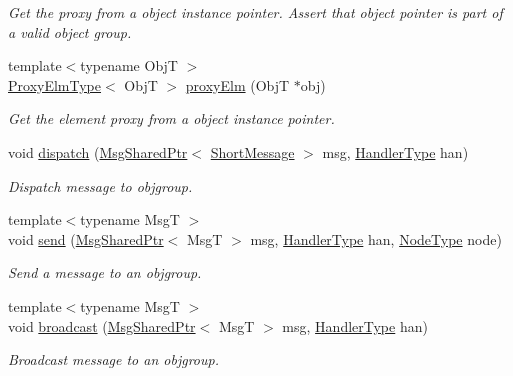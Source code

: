 \begin{DoxyCompactItemize}
\begin{DoxyCompactList}\small\item\em Get the proxy from a object instance pointer. Assert that object pointer is part of a valid object group. \end{DoxyCompactList}\item 
{\footnotesize template$<$typename ObjT $>$ }\\\hyperlink{structvt_1_1objgroup_1_1_obj_group_manager_adba6c8ecb0f4c30e719f1abb995cfc9b}{Proxy\+Elm\+Type}$<$ ObjT $>$ \hyperlink{structvt_1_1objgroup_1_1_obj_group_manager_a31f00bd509986001e3154af24239f24d}{proxy\+Elm} (ObjT $\ast$obj)
\begin{DoxyCompactList}\small\item\em Get the element proxy from a object instance pointer. \end{DoxyCompactList}\item 
void \hyperlink{structvt_1_1objgroup_1_1_obj_group_manager_ad3e01d20b90d5447445538541025aa4b}{dispatch} (\hyperlink{namespacevt_ab2b3d506ec8e8d1540aede826d84a239}{Msg\+Shared\+Ptr}$<$ \hyperlink{namespacevt_a1125ac1da6c0bbf141e0ea0739d7602d}{Short\+Message} $>$ msg, \hyperlink{namespacevt_af64846b57dfcaf104da3ef6967917573}{Handler\+Type} han)
\begin{DoxyCompactList}\small\item\em Dispatch message to objgroup. \end{DoxyCompactList}\item 
{\footnotesize template$<$typename MsgT $>$ }\\void \hyperlink{structvt_1_1objgroup_1_1_obj_group_manager_a58abda8b7d1372bea7ca061402e69c75}{send} (\hyperlink{namespacevt_ab2b3d506ec8e8d1540aede826d84a239}{Msg\+Shared\+Ptr}$<$ MsgT $>$ msg, \hyperlink{namespacevt_af64846b57dfcaf104da3ef6967917573}{Handler\+Type} han, \hyperlink{namespacevt_a866da9d0efc19c0a1ce79e9e492f47e2}{Node\+Type} node)
\begin{DoxyCompactList}\small\item\em Send a message to an objgroup. \end{DoxyCompactList}\item 
{\footnotesize template$<$typename MsgT $>$ }\\void \hyperlink{structvt_1_1objgroup_1_1_obj_group_manager_a4bd17271d7a5d298ac74c73eedde4d8d}{broadcast} (\hyperlink{namespacevt_ab2b3d506ec8e8d1540aede826d84a239}{Msg\+Shared\+Ptr}$<$ MsgT $>$ msg, \hyperlink{namespacevt_af64846b57dfcaf104da3ef6967917573}{Handler\+Type} han)
\begin{DoxyCompactList}\small\item\em Broadcast message to an objgroup. \end{DoxyCompactList}\item 

\end{DoxyCompactItemize}
